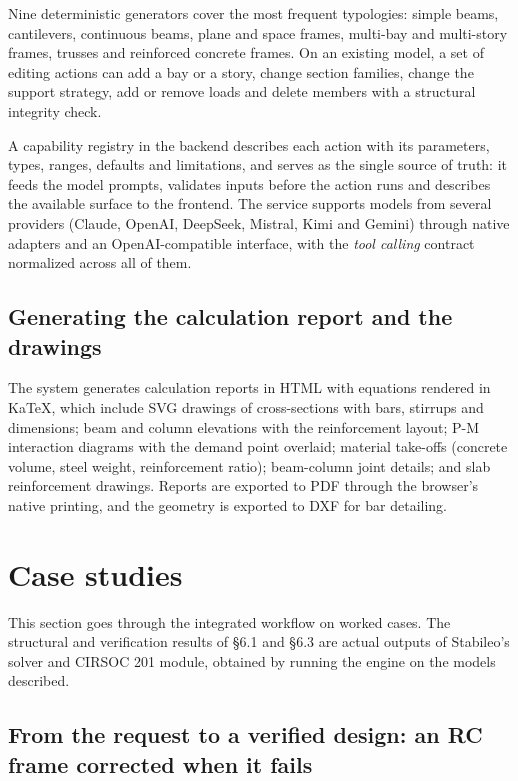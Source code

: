 \documentclass[11pt,a4paper]{article}
\begin{document}
Nine deterministic generators cover the most frequent typologies: simple beams, cantilevers, continuous beams, plane and space frames, multi-bay and multi-story frames, trusses and reinforced concrete frames. On an existing model, a set of editing actions can add a bay or a story, change section families, change the support strategy, add or remove loads and delete members with a structural integrity check.

A capability registry in the backend describes each action with its parameters, types, ranges, defaults and limitations, and serves as the single source of truth: it feeds the model prompts, validates inputs before the action runs and describes the available surface to the frontend. The service supports models from several providers (Claude, OpenAI, DeepSeek, Mistral, Kimi and Gemini) through native adapters and an OpenAI-compatible interface, with the \emph{tool calling} contract normalized across all of them.

\subsection{Generating the calculation report and the drawings}\label{sec:5.4}

The system generates calculation reports in HTML with equations rendered in KaTeX, which include SVG drawings of cross-sections with bars, stirrups and dimensions; beam and column elevations with the reinforcement layout; P-M interaction diagrams with the demand point overlaid; material take-offs (concrete volume, steel weight, reinforcement ratio); beam-column joint details; and slab reinforcement drawings. Reports are exported to PDF through the browser's native printing, and the geometry is exported to DXF for bar detailing.

\section{Case studies}\label{sec:6}

This section goes through the integrated workflow on worked cases. The structural and verification results of §6.1 and §6.3 are actual outputs of Stabileo's solver and CIRSOC 201 module, obtained by running the engine on the models described.

\subsection{From the request to a verified design: an RC frame corrected when it fails}\label{sec:6.1}
\end{document}
